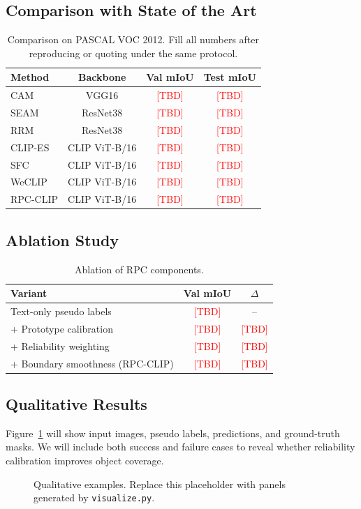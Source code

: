 \documentclass[letterpaper]{article}
\newcommand{\method}{RPC-CLIP}
\newcommand{\todo}[1]{\textcolor{red}{[#1]}}
\begin{document}
\subsection{Comparison with State of the Art}
\begin{table}[t]
\centering
\small
\begin{tabular}{lccc}
\toprule
Method & Backbone & Val mIoU & Test mIoU \\
\midrule
CAM & VGG16 & \todo{TBD} & \todo{TBD} \\
SEAM & ResNet38 & \todo{TBD} & \todo{TBD} \\
RRM & ResNet38 & \todo{TBD} & \todo{TBD} \\
CLIP-ES & CLIP ViT-B/16 & \todo{TBD} & \todo{TBD} \\
SFC & CLIP ViT-B/16 & \todo{TBD} & \todo{TBD} \\
WeCLIP & CLIP ViT-B/16 & \todo{TBD} & \todo{TBD} \\
\method & CLIP ViT-B/16 & \todo{TBD} & \todo{TBD} \\
\bottomrule
\end{tabular}
\caption{Comparison on PASCAL VOC 2012. Fill all numbers after reproducing or
quoting under the same protocol.}
\end{table}

\subsection{Ablation Study}
\begin{table}[t]
\centering
\small
\begin{tabular}{lcc}
\toprule
Variant & Val mIoU & $\Delta$ \\
\midrule
Text-only pseudo labels & \todo{TBD} & -- \\
+ Prototype calibration & \todo{TBD} & \todo{TBD} \\
+ Reliability weighting & \todo{TBD} & \todo{TBD} \\
+ Boundary smoothness (\method) & \todo{TBD} & \todo{TBD} \\
\bottomrule
\end{tabular}
\caption{Ablation of RPC components.}
\end{table}

\subsection{Qualitative Results}
Figure~\ref{fig:qualitative} will show input images, pseudo labels, predictions,
and ground-truth masks. We will include both success and failure cases to reveal
whether reliability calibration improves object coverage.
\begin{figure}[t]
\centering
\fbox{\rule{0pt}{1.2in}\rule{0.9\linewidth}{0pt}}
\caption{Qualitative examples. Replace this placeholder with panels generated
by \texttt{visualize.py}.}
\label{fig:qualitative}
\end{figure}
\end{document}
